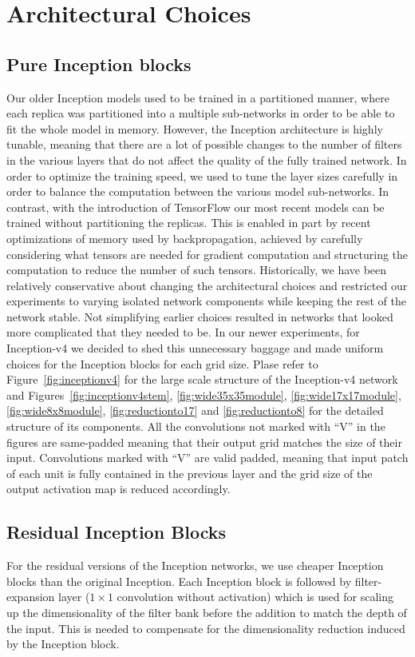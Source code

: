 \section{Architectural Choices}
\label{arch}

\subsection{Pure Inception blocks}

Our older Inception models used to be trained in a partitioned manner,
where each replica was partitioned into a multiple sub-networks in order to be able to
fit the whole model in memory. However, the Inception architecture is highly
tunable, meaning that there are a lot of possible changes to the number of filters
in the various layers that do not affect the quality of the fully trained
network. In order to optimize the training speed, we used to tune the layer sizes
carefully in order to balance the computation between the various model
sub-networks.
In contrast, with the introduction of TensorFlow our most recent models
can be trained without partitioning the replicas. This is enabled in part by recent
optimizations of memory used by backpropagation, achieved by carefully considering
what tensors are needed for gradient computation and structuring the computation
to reduce the number of such tensors. Historically, we have been
relatively conservative about changing the architectural choices and restricted
our experiments to varying isolated network components while keeping the
rest of the network stable. Not simplifying earlier choices
resulted in networks that looked more complicated that they needed to be.
In our newer experiments, for Inception-v4 we decided to shed this unnecessary
baggage and made uniform choices for the Inception blocks for each grid size.
Plase refer to Figure~\ref{fig:inceptionv4} for the large scale
structure of the Inception-v4 network and Figures~\ref{fig:inceptionv4stem},
\ref{fig:wide35x35module}, \ref{fig:wide17x17module}, \ref{fig:wide8x8module},
\ref{fig:reductionto17} and \ref{fig:reductionto8} for the detailed structure
of its components. All the convolutions not marked with ``V'' in the figures
are same-padded meaning that their output grid matches the size of their input.
Convolutions marked with ``V'' are valid padded, meaning that input patch of
each unit is fully contained in the previous layer and the grid size of the
output activation map is reduced accordingly.

\subsection{Residual Inception Blocks}
For the residual versions of the Inception networks, we use cheaper Inception
blocks than the original Inception. Each Inception block is followed by
filter-expansion layer ($1\times 1$ convolution without activation) which is
used for scaling up the dimensionality of the filter bank before the addition
to match the depth of the input. This is needed to compensate for the dimensionality
reduction induced by the Inception block.

